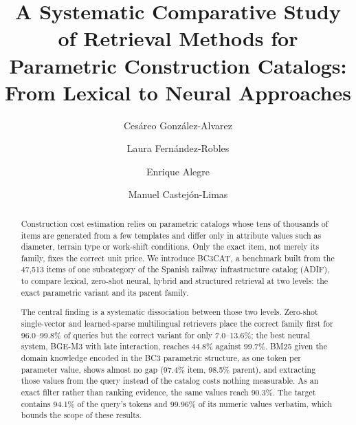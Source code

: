 \documentclass[preprint,review,12pt]{elsarticle}
\begin{document}
\linenumbers
\begin{frontmatter}


\title{A Systematic Comparative Study of Retrieval Methods for Parametric Construction Catalogs: From Lexical to Neural Approaches}

\author[deptA,b]{Cesáreo González-Alvarez}

\author[deptA]{Laura Fernández-Robles}
\author[deptA]{Enrique Alegre}
\author[deptA]{Manuel Castejón-Limas}


\begin{abstract}
Construction cost estimation relies on parametric catalogs whose tens of thousands of items are
generated from a few templates and differ only in attribute values such as diameter, terrain type
or work-shift conditions. Only the exact item, not merely its family, fixes the correct unit price.
We introduce BC3CAT, a benchmark built from the 47,513 items of one subcategory of the Spanish
railway infrastructure catalog (ADIF), to compare lexical, zero-shot neural, hybrid and
structured retrieval at two levels: the exact parametric variant and its parent family.

The central finding is a systematic dissociation between those two levels. Zero-shot
single-vector and learned-sparse multilingual retrievers place the correct family first
for 96.0--99.8\% of queries but the correct variant for only 7.0--13.6\%; the best
neural system, BGE-M3 with late interaction, reaches 44.8\% against 99.7\%. BM25 given
the domain knowledge encoded in the BC3 parametric structure, as one token per parameter
value, shows almost no gap (97.4\% item, 98.5\% parent), and extracting those values from
the query instead of the catalog costs nothing measurable. As an exact filter rather
than ranking evidence, the same values reach 90.3\%. The target contains 94.1\% of the
query's tokens and 99.96\% of its numeric values verbatim, which bounds the scope of these
results.


\end{abstract}
\end{frontmatter}
\end{document}
